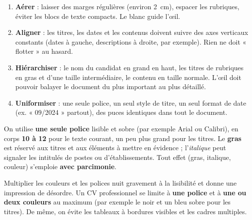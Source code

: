 \documentclass[11pt]{article}
\begin{document}
\begin{methode}
\begin{enumerate}
\item \textbf{Aérer} : laisser des marges régulières (environ \SI{2}{cm}), espacer les rubriques, éviter les blocs de texte compacts. Le blanc guide l'œil.
\item \textbf{Aligner} : les titres, les dates et les contenus doivent suivre des axes verticaux constants (dates à gauche, descriptions à droite, par exemple). Rien ne doit « flotter » au hasard.
\item \textbf{Hiérarchiser} : le nom du candidat en grand en haut, les titres de rubriques en gras et d'une taille intermédiaire, le contenu en taille normale. L'œil doit pouvoir balayer le document du plus important au plus détaillé.
\item \textbf{Uniformiser} : une seule police, un seul style de titre, un seul format de date (ex. « 09/2024 » partout), des puces identiques dans tout le document.
\end{enumerate}
\end{methode}

\begin{propriete}
On utilise \textbf{une seule police} lisible et sobre (par exemple Arial ou Calibri), en corps \textbf{10 à 12} pour le texte courant, un peu plus grand pour les titres. Le \textbf{gras} est réservé aux titres et aux éléments à mettre en évidence ; l'\emph{italique} peut signaler les intitulés de postes ou d'établissements. Tout effet (gras, italique, couleur) s'emploie \textbf{avec parcimonie}.
\end{propriete}

\begin{attention}
Multiplier les couleurs et les polices nuit gravement à la lisibilité et donne une impression de désordre. Un CV professionnel se limite à \textbf{une police} et à \textbf{une ou deux couleurs} au maximum (par exemple le noir et un bleu sobre pour les titres). De même, on évite les tableaux à bordures visibles et les cadres multiples.
\end{attention}
\end{document}

